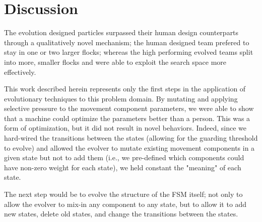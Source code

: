\documentclass[12pt,journal,compsoc]{IEEEtran}
\begin{document}
\section{Discussion}
The evolution designed particles surpassed their human design counterparts through a qualitatively novel mechanism; the human designed team prefered to stay in one or two larger flocks; whereas the high performing evolved teams split into more, smaller flocks and were able to exploit the search space more effectively.

This work described herein represents only the first steps in the application of evolutionary techniques to this problem domain. By mutating and applying selective pressure to the movement component parameters, we were able to show that a machine could optimize the parameters better than a person. This was a form of optimization, but it did not result in novel behaviors. Indeed, since we hard-wired the transitions between the states (allowing for the guarding threshold to evolve) and allowed the evolver to mutate existing movement components in a given state but not to add them (i.e., we pre-defined which components could have non-zero weight for each state), we held constant the "meaning" of each state.

The next step would be to evolve the structure of the FSM itself; not only to allow the evolver to mix-in any component to any state, but to allow it to add new states, delete old states, and change the transitions between the states.



\end{document}
